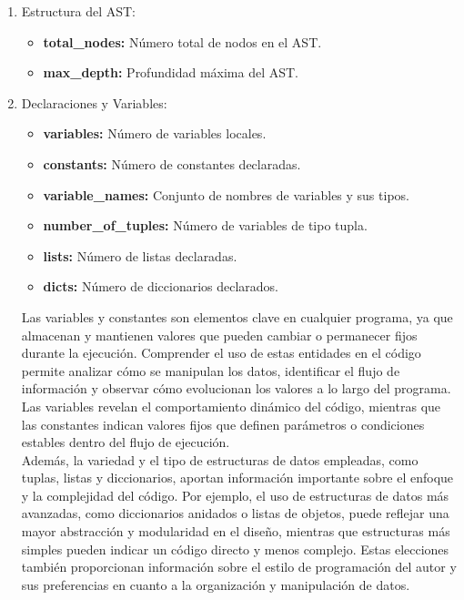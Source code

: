\begin{enumerate}
	\item Estructura del AST:
    		\begin{itemize}
			\item {\bf total\_nodes:} Número total de nodos en el AST.
			\item {\bf max\_depth:} Profundidad máxima del AST.
		\end{itemize}
		
	 \item Declaraciones y Variables:
    \begin{itemize}
        \item {\bf variables:} Número de variables locales.
        \item {\bf constants:} Número de constantes declaradas.
        \item {\bf variable\_names:} Conjunto de nombres de variables y sus tipos.
        \item {\bf number\_of\_tuples:} Número de variables de tipo tupla.
        \item {\bf lists:} Número de listas declaradas.
        \item {\bf dicts:} Número de diccionarios declarados.
    \end{itemize}
    
Las variables y constantes son elementos clave en cualquier programa, ya que almacenan y mantienen valores que pueden cambiar o permanecer fijos durante la ejecución. Comprender el uso de estas entidades en el código permite analizar cómo se manipulan los datos, identificar el flujo de información y observar cómo evolucionan los valores a lo largo del programa. Las variables revelan el comportamiento dinámico del código, mientras que las constantes indican valores fijos que definen parámetros o condiciones estables dentro del flujo de ejecución.\\

Además, la variedad y el tipo de estructuras de datos empleadas, como tuplas, listas y diccionarios, aportan información importante sobre el enfoque y la complejidad del código. Por ejemplo, el uso de estructuras de datos más avanzadas, como diccionarios anidados o listas de objetos, puede reflejar una mayor abstracción y modularidad en el diseño, mientras que estructuras más simples pueden indicar un código directo y menos complejo. Estas elecciones también proporcionan información sobre el estilo de programación del autor y sus preferencias en cuanto a la organización y manipulación de datos.


\end{enumerate}
